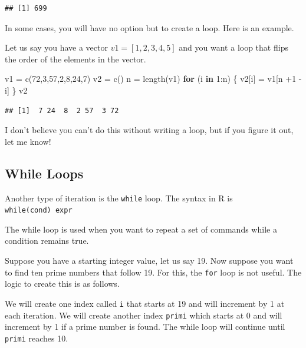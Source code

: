 \documentclass[
]{article}
\newenvironment{Shaded}{\begin{snugshade}}{\end{snugshade}}
\newcommand{\ControlFlowTok}[1]{\textcolor[rgb]{0.13,0.29,0.53}{\textbf{#1}}}
\newcommand{\DecValTok}[1]{\textcolor[rgb]{0.00,0.00,0.81}{#1}}
\newcommand{\FunctionTok}[1]{\textcolor[rgb]{0.00,0.00,0.00}{#1}}
\newcommand{\NormalTok}[1]{#1}
\newcommand{\OtherTok}[1]{\textcolor[rgb]{0.56,0.35,0.01}{#1}}
\newcommand{\SpecialCharTok}[1]{\textcolor[rgb]{0.00,0.00,0.00}{#1}}
\begin{document}
\begin{verbatim}
## [1] 699
\end{verbatim}

In some cases, you will have no option but to create a loop. Here is an
example.

Let us say you have a vector \(v1 = [1,2,3,4,5]\) and you want a loop
that flips the order of the elements in the vector.

\begin{Shaded}
\begin{Highlighting}[]
\NormalTok{v1 }\OtherTok{=} \FunctionTok{c}\NormalTok{(}\DecValTok{72}\NormalTok{,}\DecValTok{3}\NormalTok{,}\DecValTok{57}\NormalTok{,}\DecValTok{2}\NormalTok{,}\DecValTok{8}\NormalTok{,}\DecValTok{24}\NormalTok{,}\DecValTok{7}\NormalTok{)}
\NormalTok{v2 }\OtherTok{=} \FunctionTok{c}\NormalTok{()}
\NormalTok{n }\OtherTok{=} \FunctionTok{length}\NormalTok{(v1)}
\ControlFlowTok{for}\NormalTok{ (i }\ControlFlowTok{in} \DecValTok{1}\SpecialCharTok{:}\NormalTok{n)}
\NormalTok{\{}
\NormalTok{  v2[i] }\OtherTok{=}\NormalTok{ v1[n }\SpecialCharTok{+}\DecValTok{1} \SpecialCharTok{{-}}\NormalTok{ i]}
\NormalTok{\}}
\NormalTok{v2}
\end{Highlighting}
\end{Shaded}

\begin{verbatim}
## [1]  7 24  8  2 57  3 72
\end{verbatim}

I don't believe you can't do this without writing a loop, but if you
figure it out, let me know!

\hypertarget{while-loops}{%
\subsection{While Loops}\label{while-loops}}

Another type of iteration is the \texttt{while} loop. The syntax in R
is\\
\texttt{while(cond)\ expr}

The while loop is used when you want to repeat a set of commands while a
condition remains true.

Suppose you have a starting integer value, let us say 19. Now suppose
you want to find ten prime numbers that follow 19. For this, the
\texttt{for} loop is not useful. The logic to create this is as follows.

We will create one index called \texttt{i} that starts at 19 and will
increment by 1 at each iteration. We will create another index
\texttt{primi} which starts at 0 and will increment by 1 if a prime
number is found. The while loop will continue until \texttt{primi}
reaches 10.
\end{document}
